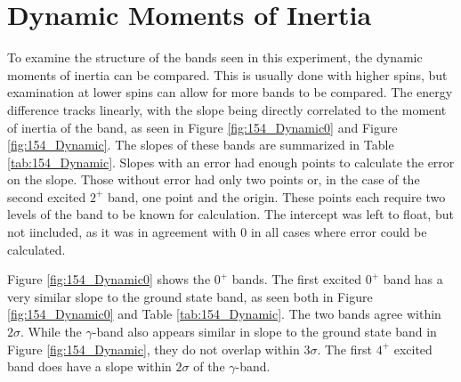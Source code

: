 \section{Dynamic Moments of Inertia}
\label{sec:154_Dynamic}

To examine the structure of the bands seen in this experiment, the dynamic moments of inertia can be compared. This is usually done with higher spins, but examination at lower spins can allow for more bands to be compared. The energy difference tracks linearly, with the slope being directly correlated to the moment of inertia of the band, as seen in Figure \ref{fig:154_Dynamic0} and Figure \ref{fig:154_Dynamic}. The slopes of these bands are summarized in Table \ref{tab:154_Dynamic}. Slopes with an error had enough points to calculate the error on the slope. Those without error had only two points or, in the case of the second excited $2^+$ band, one point and the origin. These points each require two levels of the band to be known for calculation. The intercept was left to float, but not iincluded, as it was in agreement with 0 in all cases where error could be calculated.







Figure \ref{fig:154_Dynamic0} shows the $0^+$ bands. The first excited $0^+$ band has a very similar slope to the ground state band, as seen both in Figure \ref{fig:154_Dynamic0} and Table \ref{tab:154_Dynamic}. The two bands agree within $2\sigma$. While the $\gamma$-band also appears similar in slope to the ground state band in Figure \ref{fig:154_Dynamic}, they do not overlap within $3\sigma$. The first $4^+$ excited band does have a slope within $2\sigma$ of the $\gamma$-band.